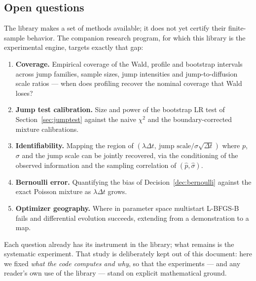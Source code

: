 \subsection*{Open questions}

The library makes a set of methods available; it does not yet certify
their finite-sample behavior. The companion research program, for which
this library is the experimental engine, targets exactly that gap:

\begin{enumerate}
  \item \textbf{Coverage.} Empirical coverage of the Wald, profile and
        bootstrap intervals across jump families, sample sizes, jump
        intensities and jump-to-diffusion scale ratios --- when does
        profiling recover the nominal coverage that Wald loses?
  \item \textbf{Jump test calibration.} Size and power of the bootstrap
        LR test of Section~\ref{sec:jumptest} against the naive
        $\chi^2$ and the boundary-corrected mixture calibrations.
  \item \textbf{Identifiability.} Mapping the region of
        $(\lambda\Delta t,\ \text{jump scale}/\sigma\sqrt{\Delta t})$
        where $p$, $\sigma$ and the jump scale can be jointly recovered,
        via the conditioning of the observed information and the sampling
        correlation of $(\hat p, \hat\sigma)$.
  \item \textbf{Bernoulli error.} Quantifying the bias of
        Decision~\ref{dec:bernoulli} against the exact Poisson mixture as
        $\lambda\Delta t$ grows.
  \item \textbf{Optimizer geography.} Where in parameter space multistart
        L-BFGS-B fails and differential evolution succeeds, extending
        \citet{Ardia2011} from a demonstration to a map.
\end{enumerate}

Each question already has its instrument in the library; what remains is
the systematic experiment. That study is deliberately kept out of this
document: here we fixed \emph{what the code computes and why}, so that the
experiments --- and any reader's own use of the library --- stand on
explicit mathematical ground.
